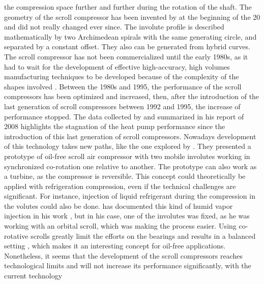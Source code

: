 \begin{description}
  the compression space further and further during the rotation of the
  shaft. The geometry of the scroll compressor has been invented by
  \citet{creux-1905a} at the beginning of the 20\th{} and did not
  really changed ever since. The involute profile is described
  mathematically by two Archimedean spirals with the same generating
  circle, and separated by a constant offset. They also can be
  generated from hybrid curves. The scroll compressor has not been
  commercialized until the early 1980s, as it had to wait for the
  development of effective high-accuracy, high volumes manufacturing
  techniques to be developed because of the complexity of the shapes
  involved \citep[p.\,16]{zogg-2008a}. Between the 1980s and 1995, the
  performance of the scroll compressors has been optimized and
  increased, then, after the introduction of the last generation of
  scroll compressors between 1992 and 1995, the increase of
  performance stopped. The data collected by
  \citet{Eschmann-2009a} and summarized in his
  report of 2008 highlights the stagnation of the heat pump
  performance since the introduction of this last generation of scroll
  compressors. Nowadays development of this technology takes new
  paths, like the one explored by \citet{Iglesias-favrat-2014a}. They
  presented a prototype of oil-free scroll air compressor with two
  mobile involutes working in synchronized co-rotation one relative to
  another. The prototype can also work as a turbine, as the compressor
  is reversible. This concept could theoretically be applied with
  refrigeration compression, even if the technical challenges are
  significant. For instance, injection of liquid refrigerant during
  the compression in the volutes could also be
  done. \citet{Zehnder-2004a} has documented this kind of humid vapor
  injection in his work \citep{zehnder-favrat-2010a}, but in his case,
  one of the involutes was fixed, as he was working with an orbital
  scroll, which was making the process easier. Using co-rotative
  scrolls greatly limit the efforts on the bearings and results in a
  balanced setting \citep[Fig.\,2 p.\,567]{Iglesias-favrat-2014a},
  which makes it an interesting concept for oil-free
  applications. Nonetheless, it seems that the development of the
  scroll compressors reaches technological limits and will not
  increase its performance significantly, with the current technology

\end{description}
